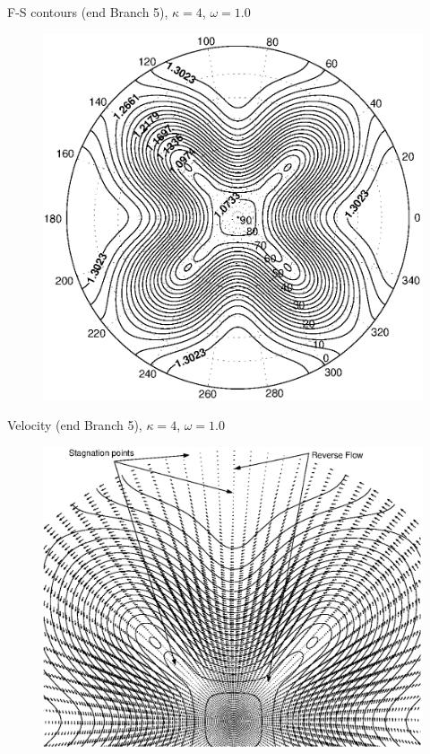 \documentclass[pdf,distiller]{prosper}
\begin{document}
\begin{slide}{F-S contours (end Branch 5), $\kappa=4$, $\omega=1.0$}
\begin{figure}
	\centering
		\includegraphics[scale=0.55]{k4w1fsb5end.eps}
	\end{figure}
\end{slide}


\begin{slide}{Velocity (end Branch 5), $\kappa=4$, $\omega=1.0$}
\begin{figure}
	\centering
		\includegraphics[scale=0.54]{k4w1fsvvb5end.eps}
\end{figure}
\end{slide}
\end{document}
